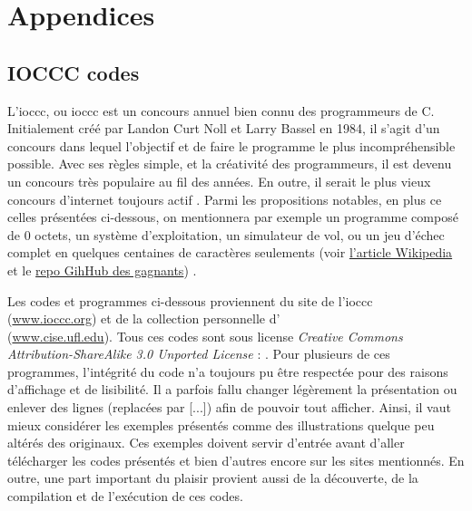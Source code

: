 \documentclass[12pt]{article} %
\begin{document}
\newpage
\section{Appendices}

\subsection{IOCCC codes}

L'\acrshort{ioccc}, ou \acrlong{ioccc} est un concours annuel bien connu des programmeurs de C. Initialement créé par Landon Curt Noll et Larry Bassel en 1984, il s'agit d'un concours dans lequel l'objectif et de faire le programme le plus incompréhensible possible. Avec ses règles simple, et la créativité des programmeurs, il est devenu un concours très populaire au fil des années. En outre, il serait le plus vieux concours d'internet toujours actif \cite{IOCCC-readme-github}. Parmi les propositions notables, en plus ce celles présentées ci-dessous, on mentionnera par exemple un programme composé de 0 octets, un système d'exploitation, un simulateur de vol, ou un jeu d'échec complet en quelques centaines de caractères seulements (voir \href{https://en.wikipedia.org/wiki/International_Obfuscated_C_Code_Contest}{l'article Wikipedia} et le \href{https://github.com/ioccc-src/winner}{repo GihHub des gagnants}) \cite{Wikipedia-IOCCC} \cite{IOCCC-homepage}.

Les codes et programmes ci-dessous proviennent du site de l'\acrshort{ioccc} \\(\href{https://www.ioccc.org/}{www.ioccc.org}) et de la collection personnelle d'\citeauthor{MEnriqueBermudez-ObfuscatedCCode} \\(\href{https://www.cise.ufl.edu/~manuel/obfuscate/obfuscate.html}{www.cise.ufl.edu}). Tous ces codes sont sous license {\itshape Creative Commons Attribution\hyp{}ShareAlike 3.0 Unported License} : . Pour plusieurs de ces programmes, l'intégrité du code n'a toujours pu être respectée pour des raisons d'affichage et de lisibilité. Il a parfois fallu changer légèrement la présentation ou enlever des lignes (replacées par [...]) afin de pouvoir tout afficher. Ainsi, il vaut mieux considérer les exemples présentés comme des illustrations quelque peu altérés des originaux. Ces exemples doivent servir d'entrée avant d'aller télécharger les codes présentés et bien d'autres encore sur les sites mentionnés. En outre, une part important du plaisir provient aussi de la découverte, de la compilation et de l'exécution de ces codes.
\end{document}

